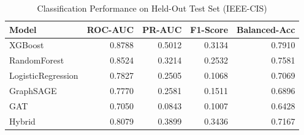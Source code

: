 \begin{table}
\caption{Classification Performance on Held-Out Test Set (IEEE-CIS)}
\label{tab:classification_metrics}
\begin{tabular}{lrrrr}
\toprule
Model & ROC-AUC & PR-AUC & F1-Score & Balanced-Acc \\
\midrule
XGBoost & 0.8788 & 0.5012 & 0.3134 & 0.7910 \\
RandomForest & 0.8524 & 0.3214 & 0.2532 & 0.7581 \\
LogisticRegression & 0.7827 & 0.2505 & 0.1068 & 0.7069 \\
GraphSAGE & 0.7770 & 0.2581 & 0.1511 & 0.6896 \\
GAT & 0.7050 & 0.0843 & 0.1007 & 0.6428 \\
Hybrid & 0.8079 & 0.3899 & 0.3436 & 0.7167 \\
\bottomrule
\end{tabular}
\end{table}
